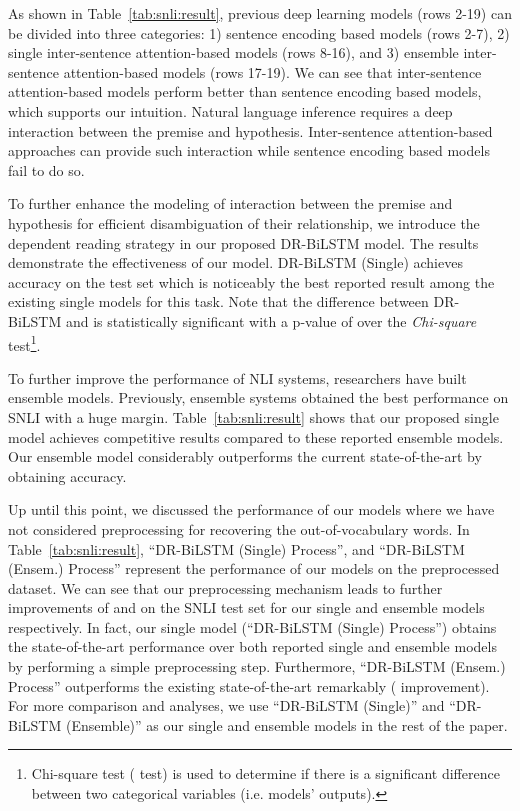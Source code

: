 \documentclass[11pt,a4paper]{article}
\begin{document}
	As shown in Table~\ref{tab:snli:result}, previous deep learning models (rows 2-19) can be divided into three categories: 1) sentence encoding based models (rows 2-7), 2) single inter-sentence attention-based models (rows 8-16), and 3) ensemble inter-sentence attention-based models (rows 17-19). We can see that inter-sentence attention-based models perform better than sentence encoding based models, which supports our intuition. Natural language inference requires a deep interaction between the premise and hypothesis. Inter-sentence attention-based approaches can provide such interaction while sentence encoding based models fail to do so. 

	To further enhance the modeling of interaction between the premise and hypothesis for efficient disambiguation of their relationship, we introduce the dependent reading strategy in our proposed DR-BiLSTM model. The results demonstrate the effectiveness of our model. DR-BiLSTM (Single) achieves  accuracy on the test set which is noticeably the best reported result among the existing single models for this task. Note that the difference between DR-BiLSTM and \citet{him2017} is statistically significant with a p-value of  over the \emph{Chi-square} test\footnote{Chi-square test ( test) is used to determine if there is a significant difference between two categorical variables (i.e. models' outputs).}.
	
	To further improve the performance of NLI systems, researchers have built ensemble models. Previously, ensemble systems obtained the best performance on SNLI with a huge margin. Table~\ref{tab:snli:result} shows that our proposed single model achieves competitive results compared to these reported ensemble models. Our ensemble model considerably outperforms the current state-of-the-art by obtaining  accuracy.
	
	Up until this point, we discussed the performance of our models where we have not considered preprocessing for recovering the out-of-vocabulary words. In Table~\ref{tab:snli:result}, ``DR-BiLSTM (Single)  Process'', and ``DR-BiLSTM (Ensem.)  Process'' represent the performance of our models on the preprocessed dataset. We can see that our preprocessing mechanism leads to further improvements of  and  on the SNLI test set for our single and ensemble models respectively. In fact, our single model (``DR-BiLSTM (Single)  Process'') obtains the state-of-the-art performance over both reported single and ensemble models by performing a simple preprocessing step. Furthermore, ``DR-BiLSTM (Ensem.)  Process'' outperforms the existing state-of-the-art remarkably ( improvement). For more comparison and analyses, we use ``DR-BiLSTM (Single)'' and ``DR-BiLSTM (Ensemble)'' as our single and ensemble models in the rest of the paper.
	
\end{document}
